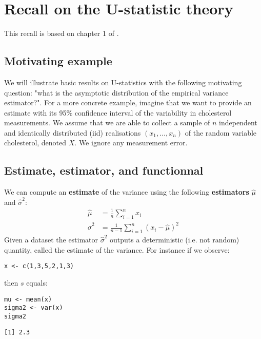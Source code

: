 \documentclass[12pt]{article}
\begin{document}
\section{Recall on the U-statistic theory}
\label{SM:Ustat}
This recall is based on chapter 1 of \cite{lee1990u}.

\subsection{Motivating example}
\label{sec:org95bfc16}

We will illustrate basic results on U-statistics with the following
motivating question: "what is the asymptotic distribution of the
empirical variance estimator?". For a more concrete example, imagine
that we want to provide an estimate with its 95\% confidence interval
of the variability in cholesterol measurements. We assume that we are
able to collect a sample of \(n\) independent and identically
distributed (iid) realisations \((x_1,\ldots,x_n)\) of the random
variable cholesterol, denoted \(X\). We ignore any measurement error.

\subsection{Estimate, estimator, and functionnal}
\label{sec:orgba588dd}

We can compute an \textbf{estimate} of the variance using the following
\textbf{estimators} \(\hat{\mu}\) and \(\hat{\sigma}^2\):
\begin{align}
\hat{\mu} &= \frac{1}{n} \sum_{i=1}^n x_i \label{eq:m(F)} \\
\hat{\sigma}^2 &= \frac{1}{n-1} \sum_{i=1}^n (x_i-\hat{\mu})^2 \label{eq:s(F)}
\end{align}
Given a dataset the estimator \(\hat{\sigma}^2\) outputs a
deterministic (i.e. not random) quantity, called the estimate of the
variance. For instance if we observe:
\lstset{language=r,label= ,caption= ,captionpos=b,numbers=none}
\begin{lstlisting}
x <- c(1,3,5,2,1,3)
\end{lstlisting}

then \(s\) equals:
\lstset{language=r,label= ,caption= ,captionpos=b,numbers=none}
\begin{lstlisting}
mu <- mean(x)
sigma2 <- var(x)
sigma2
\end{lstlisting}

\begin{verbatim}
[1] 2.3
\end{verbatim}
\end{document}
